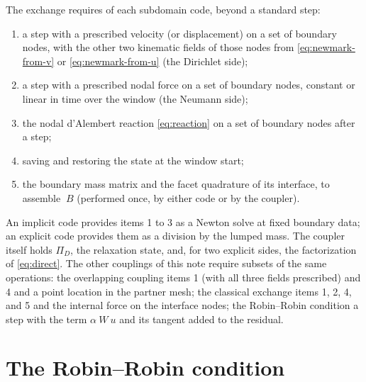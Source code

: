 \documentclass[11pt]{article}
\begin{document}
The exchange requires of each subdomain code, beyond a standard step:
\begin{enumerate}[itemsep=2pt]
\item a step with a prescribed velocity (or displacement) on a set of
  boundary nodes, with the other two kinematic fields of those nodes from
  \eqref{eq:newmark-from-v} or \eqref{eq:newmark-from-u} (the Dirichlet
  side);
\item a step with a prescribed nodal force on a set of boundary nodes,
  constant or linear in time over the window (the Neumann side);
\item the nodal d'Alembert reaction \eqref{eq:reaction} on a set of
  boundary nodes after a step;
\item saving and restoring the state at the window start;
\item the boundary mass matrix and the facet quadrature of its interface,
  to assemble $~B$ (performed once, by either code or by the coupler).
\end{enumerate}
An implicit code provides items 1 to 3 as a Newton solve at fixed boundary
data; an explicit code provides them as a division by the lumped mass. The
coupler itself holds $\Pi_D$, the relaxation state, and, for two explicit
sides, the factorization of \eqref{eq:direct}. The other couplings of this
note require subsets of the same operations: the overlapping coupling
items 1 (with all three fields prescribed) and 4 and a point location in
the partner mesh; the classical exchange items 1, 2, 4, and 5 and the
internal force on the interface nodes; the Robin--Robin condition a step
with the term $\alpha ~W ~u$ and its tangent added to the residual.

\section{The Robin--Robin condition}
\label{sec:rr}
\end{document}
